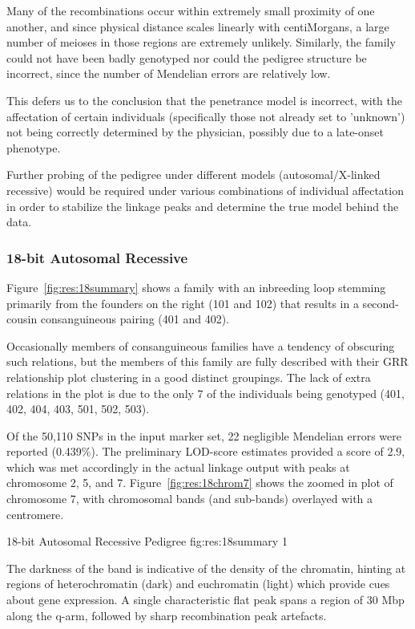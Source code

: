 Many of the recombinations occur within extremely small proximity of one another, and since physical distance scales linearly with centiMorgans, a large number of meioses in those regions are extremely unlikely. Similarly,  the family could not have been badly genotyped nor could the pedigree structure be incorrect, since the number of Mendelian errors are relatively low.

This defers us to the conclusion that the penetrance model is incorrect, with the affectation of certain individuals (specifically those not already set to 'unknown') not being correctly determined by the physician, possibly due to a late-onset phenotype.

Further probing of the pedigree under different models (autosomal/X-linked recessive)  would be required under various combinations of individual affectation in order to stabilize the linkage peaks and determine the true model behind the data.

\subsubsection*{18-bit Autosomal Recessive}

Figure~\ref{fig:res:18summary} shows a family with an inbreeding loop stemming primarily from the founders on the right (101 and 102) that results in a second-cousin consanguineous pairing (401 and 402).

Occasionally members of consanguineous families have a tendency of obscuring such relations, but the members of this family are fully described with their GRR relationship plot clustering in a good distinct groupings. The lack of extra relations in the plot is due to the only 7 of the individuals being genotyped (401, 402, 404, 403, 501, 502, 503).

Of the 50,110 SNPs in the input marker set, 22 negligible Mendelian errors were reported (0.439\%). The preliminary  LOD-score estimates provided a score of 2.9, which was met accordingly in the actual linkage output with peaks at chromosome 2, 5, and 7. Figure~\ref{fig:res:18chrom7} shows the zoomed in plot of chromosome 7, with chromosomal bands (and sub-bands) overlayed with a centromere. 

	{18-bit Autosomal Recessive Pedigree}
	{fig:res:18summary}
	{1}{}
	
The darkness of the band is indicative of the density of the chromatin, hinting at regions of heterochromatin (dark) and euchromatin (light) which provide cues about gene expression. A single characteristic flat peak spans a region of 30 Mbp along the q-arm, followed by sharp recombination peak artefacts.

